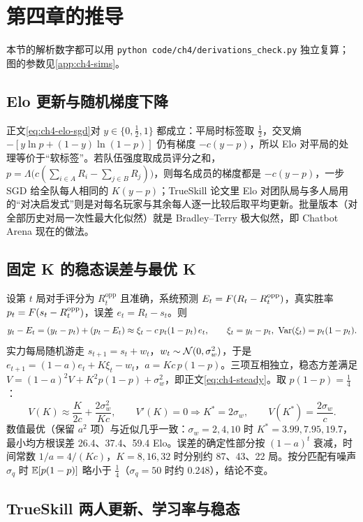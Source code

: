 \section{第四章的推导}
\label{app:ch4}

本节的解析数字都可以用 \texttt{python code/ch4/derivations\_check.py} 独立复算；图的参数见\cref{app:ch4-sims}。

\subsection{Elo 更新与随机梯度下降}
\label{app:ch4-sgd}

正文\cref{eq:ch4-elo-sgd}对 $y\in\{0,\tfrac12,1\}$ 都成立：平局时标签取 $\tfrac12$，交叉熵 $-[y\ln p+(1-y)\ln(1-p)]$ 仍有梯度 $-c(y-p)$，所以 Elo 对平局的处理等价于“软标签”。若队伍强度取成员评分之和，$p=\Lambda\bigl(c(\sum_{i\in A}R_i-\sum_{j\in B}R_j)\bigr)$，则每名成员的梯度都是 $-c(y-p)$，一步 SGD 给全队每人相同的 $K(y-p)$；TrueSkill 论文里 Elo 对团队局与多人局用的“对决启发式”则是对每名玩家与其余每人逐一比较后取平均更新\cite{herbrich2006trueskill}。批量版本（对全部历史对局一次性最大化似然）就是 Bradley–Terry 极大似然\cite{bradley1952rank}，即 Chatbot Arena 现在的做法。

\subsection{固定 K 的稳态误差与最优 K}
\label{app:ch4-steady}

设第 $t$ 局对手评分为 $R^{\mathrm{opp}}_t$ 且准确，系统预测 $E_t=F(R_t-R^{\mathrm{opp}}_t)$，真实胜率 $p_t=F(s_t-R^{\mathrm{opp}}_t)$，误差 $e_t=R_t-s_t$。则
\[
y_t-E_t=(y_t-p_t)+(p_t-E_t)\approx\xi_t-c\,p_t(1-p_t)\,e_t,\qquad \xi_t=y_t-p_t,\ \operatorname{Var}(\xi_t)=p_t(1-p_t).
\]
实力每局随机游走 $s_{t+1}=s_t+w_t$，$w_t\sim\mathcal{N}(0,\sigma_w^2)$，于是 $e_{t+1}=(1-a)e_t+K\xi_t-w_t$，$a=Kc\,p(1-p)$。三项互相独立，稳态方差满足 $V=(1-a)^2V+K^2p(1-p)+\sigma_w^2$，即正文\cref{eq:ch4-steady}。取 $p(1-p)=\tfrac14$：
\[
V(K)\approx\frac{K}{2c}+\frac{2\sigma_w^2}{Kc},\qquad V'(K)=0\Rightarrow K^*=2\sigma_w,\qquad V(K^*)=\frac{2\sigma_w}{c}.
\]
数值最优（保留 $a^2$ 项）与近似几乎一致：$\sigma_w=2,4,10$ 时 $K^*=3.99,7.95,19.7$，最小均方根误差 26.4、37.4、59.4 Elo。误差的确定性部分按 $(1-a)^t$ 衰减，时间常数 $1/a=4/(Kc)$，$K=8,16,32$ 时分别约 87、43、22 局。按分匹配有噪声 $\sigma_q$ 时 $\mathbb{E}[p(1-p)]$ 略小于 $\tfrac14$（$\sigma_q=50$ 时约 0.248），结论不变。

\subsection{TrueSkill 两人更新、学习率与稳态}
\label{app:ch4-trueskill}

